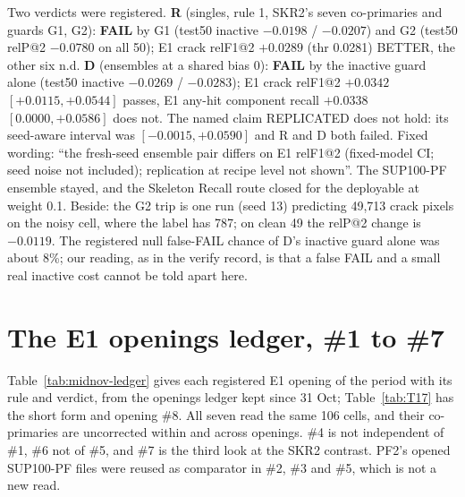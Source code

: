 Two verdicts were registered. \textbf{R} (singles, rule 1, SKR2's seven co-primaries and guards G1, G2): \textbf{FAIL} by G1 (test50
inactive $-0.0198$ / $-0.0207$) and G2 (test50 relP@2 $-0.0780$ on all 50); E1 crack relF1@2 $+0.0289$ (thr 0.0281) BETTER, the other
six n.d. \textbf{D} (ensembles at a shared bias 0): \textbf{FAIL} by the inactive guard alone (test50 inactive $-0.0269$ / $-0.0283$);
E1 crack relF1@2 $+0.0342$ $[+0.0115, +0.0544]$ passes, E1 any-hit component recall $+0.0338$ $[0.0000, +0.0586]$ does not. The named
claim REPLICATED does not hold: its seed-aware interval was $[-0.0015, +0.0590]$ and R and D both failed. Fixed wording: ``the
fresh-seed ensemble pair differs on E1 relF1@2 (fixed-model CI; seed noise not included); replication at recipe level not shown''.
The SUP100-PF ensemble stayed, and the Skeleton Recall route closed for the deployable at weight 0.1. Beside: the G2 trip is one run
(seed 13) predicting 49,713 crack pixels on the noisy cell, where the label has 787; on clean 49 the relP@2 change is $-0.0119$. The
registered null false-FAIL chance of D's inactive guard alone was about 8\%; our reading, as in the verify record, is that a false
FAIL and a small real inactive cost cannot be told apart here.

\section{The E1 openings ledger, \#1 to \#7}\label{sec:midnov-ledger}

Table~\ref{tab:midnov-ledger} gives each registered E1 opening of the period with its rule and verdict, from the openings ledger
kept since 31 Oct; Table~\ref{tab:T17} has the short form and opening \#8. All seven read the same 106 cells, and their co-primaries
are uncorrected within and across openings. \#4 is not independent of \#1, \#6 not of \#5, and \#7 is the third look at the SKR2
contrast. PF2's opened SUP100-PF files were reused as comparator in \#2, \#3 and \#5, which is not a new read.

